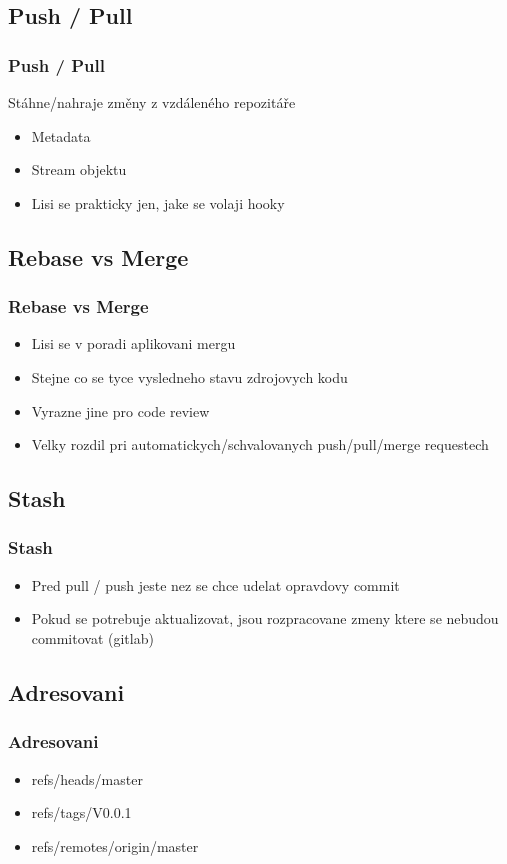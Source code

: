 \documentclass{beamer}
\begin{document}
\subsection{Push / Pull}
\begin{frame}
 \frametitle{Push / Pull}
  Stáhne/nahraje změny z vzdáleného repozitáře
  
  \begin{itemize}
   \item Metadata
   \item Stream objektu
   \item Lisi se prakticky jen, jake se volaji hooky
  \end{itemize}
\end{frame}

\subsection{Rebase vs Merge}
\begin{frame}
  \frametitle{Rebase vs Merge} 
  \begin{itemize}
    \item Lisi se v poradi aplikovani mergu
    \item Stejne co se tyce vysledneho stavu zdrojovych kodu
    \item Vyrazne jine pro code review
    \item Velky rozdil pri automatickych/schvalovanych push/pull/merge requestech
  \end{itemize}
\end{frame}

\subsection{Stash}
\begin{frame}
 \frametitle{Stash}
 \begin{itemize}
  \item Pred pull / push jeste nez se chce udelat opravdovy commit
  \item Pokud se potrebuje aktualizovat, jsou rozpracovane zmeny ktere se nebudou commitovat (gitlab)
 \end{itemize}
\end{frame}

\subsection{Adresovani}
\begin{frame}
 \frametitle{Adresovani}
 \begin{itemize}
  \item refs/heads/master
  \item refs/tags/V0.0.1
  \item refs/remotes/origin/master
 \end{itemize}
\end{frame}
\end{document}

